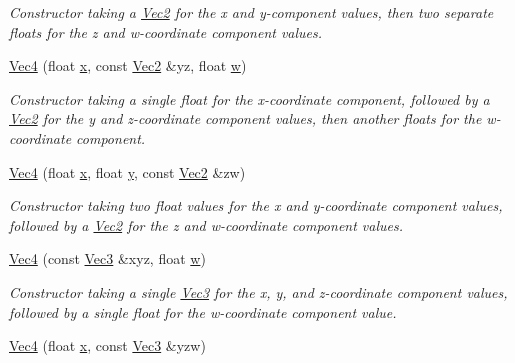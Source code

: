 \begin{DoxyCompactItemize}
\begin{DoxyCompactList}\small\item\em Constructor taking a \hyperlink{classgfxmath_1_1_vec2}{Vec2} for the x and y-\/component values, then two separate floats for the z and w-\/coordinate component values. \end{DoxyCompactList}\item 
\hyperlink{classgfxmath_1_1_vec4_a8211b449c2b1bbd084a7afb023525a03}{Vec4} (float \hyperlink{classgfxmath_1_1_vec4_a273598aff75406f0e7a47121b8b06037}{x}, const \hyperlink{classgfxmath_1_1_vec2}{Vec2} \&yz, float \hyperlink{classgfxmath_1_1_vec4_adf2769a47b464dfee8d04e191f21701e}{w})
\begin{DoxyCompactList}\small\item\em Constructor taking a single float for the x-\/coordinate component, followed by a \hyperlink{classgfxmath_1_1_vec2}{Vec2} for the y and z-\/coordinate component values, then another floats for the w-\/coordinate component. \end{DoxyCompactList}\item 
\hyperlink{classgfxmath_1_1_vec4_a1565b9d0e01810e9b9cbe4fc2c82055c}{Vec4} (float \hyperlink{classgfxmath_1_1_vec4_a273598aff75406f0e7a47121b8b06037}{x}, float \hyperlink{classgfxmath_1_1_vec4_a95e0ca27d66d7e0223606c20d326b595}{y}, const \hyperlink{classgfxmath_1_1_vec2}{Vec2} \&zw)
\begin{DoxyCompactList}\small\item\em Constructor taking two float values for the x and y-\/coordinate component values, followed by a \hyperlink{classgfxmath_1_1_vec2}{Vec2} for the z and w-\/coordinate component values. \end{DoxyCompactList}\item 
\hyperlink{classgfxmath_1_1_vec4_a115b5e4a0a51582b23f058ad225843b1}{Vec4} (const \hyperlink{classgfxmath_1_1_vec3}{Vec3} \&xyz, float \hyperlink{classgfxmath_1_1_vec4_adf2769a47b464dfee8d04e191f21701e}{w})
\begin{DoxyCompactList}\small\item\em Constructor taking a single \hyperlink{classgfxmath_1_1_vec3}{Vec3} for the x, y, and z-\/coordinate component values, followed by a single float for the w-\/coordinate component value. \end{DoxyCompactList}\item 
\hyperlink{classgfxmath_1_1_vec4_a43924f8c2f48fc84c10bba432921d6cc}{Vec4} (float \hyperlink{classgfxmath_1_1_vec4_a273598aff75406f0e7a47121b8b06037}{x}, const \hyperlink{classgfxmath_1_1_vec3}{Vec3} \&yzw)

\end{DoxyCompactItemize}

